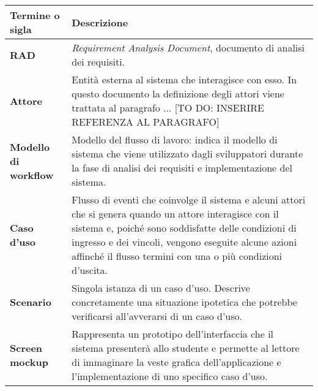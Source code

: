 \begin{table}
\begin{tabular}{p{1.5in}|p{4in}} \\
	{\bf Termine o sigla} & {\bf Descrizione} \\ \hline
	\textbf{RAD} & \textit{Requirement Analysis Document}, documento di analisi dei requisiti. \\
	\textbf{Attore} &  Entità esterna al sistema che interagisce con
	esso. In questo documento la definizione degli attori viene trattata al paragrafo ... [TO DO: INSERIRE REFERENZA AL PARAGRAFO] \\
	\textbf{Modello di workflow} & Modello del flusso di lavoro: indica il modello di sistema che viene utilizzato dagli sviluppatori durante la fase di analisi dei requisiti e implementazione del sistema. \\
	\textbf{Caso d'uso} & Flusso di eventi che coinvolge il sistema e alcuni attori che si genera quando  un attore interagisce con il sistema e, poiché sono soddisfatte delle condizioni di ingresso e dei vincoli, vengono eseguite alcune azioni affinché il flusso termini con una o più condizioni d’uscita. \\
	\textbf{Scenario} & Singola istanza di un caso d’uso. Descrive
	concretamente una situazione ipotetica che potrebbe verificarsi all'avverarsi di un caso d’uso. \\
	\textbf{Screen mockup} & Rappresenta un prototipo dell’interfaccia che il sistema presenterà allo studente e permette al lettore di immaginare la veste grafica dell’applicazione e l’implementazione di uno specifico caso d’uso. \\
\end{tabular}
\end{table}
\clearpage